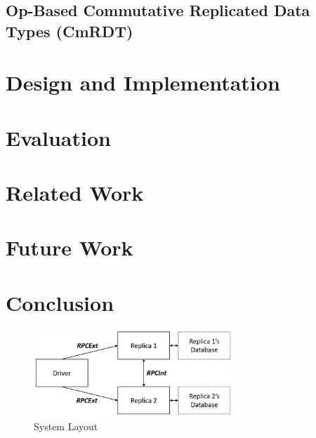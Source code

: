 \documentclass[sigconf,nonacm]{acmart}
\begin{document}
\subsection{Op-Based Commutative Replicated Data Types (CmRDT)}

\section{Design and Implementation}

\section{Evaluation}

\section{Related Work}

\section{Future Work}

\section{Conclusion}

\begin{figure}[h]
  \centering
  \includegraphics[width=7.5cm]{fig1}
  \caption{System Layout}
  \label{fig:sys}
\end{figure}



\end{document}
